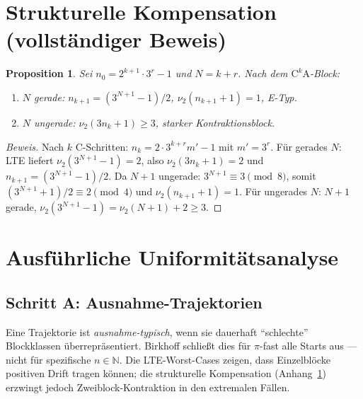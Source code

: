\documentclass[12pt,a4paper]{article}
\newtheorem{proposition}[satz]{Proposition}
\newenvironment{beweis}{\begin{proof}[Beweis]}{\end{proof}}
\newcommand{\vii}{\nu_2}
\newcommand{\N}{\mathbb{N}}
\begin{document}
\appendix

\section{Strukturelle Kompensation (vollständiger Beweis)}
\label{anhang:kompensation}

\begin{proposition}
Sei $n_0 = 2^{k+1}\cdot 3^r - 1$ und $N = k+r$. Nach dem
$\mathrm{C}^k\mathrm{A}$-Block:
\begin{enumerate}[label=(\roman*)]
  \item $N$ gerade: $n_{k+1} = (3^{N+1}-1)/2$, $\vii(n_{k+1}+1)=1$, E-Typ.
  \item $N$ ungerade: $\vii(3n_k+1) \geq 3$, starker Kontraktionsblock.
\end{enumerate}
\end{proposition}

\begin{beweis}
Nach $k$ C-Schritten: $n_k = 2\cdot 3^{k+r} m' - 1$ mit $m'=3^r$.
Für gerades $N$: LTE liefert $\vii(3^{N+1}-1)=2$, also
$\vii(3n_k+1)=2$ und $n_{k+1}=(3^{N+1}-1)/2$.
Da $N+1$ ungerade: $3^{N+1} \equiv 3 \pmod 8$, somit
$(3^{N+1}+1)/2 \equiv 2 \pmod 4$ und $\vii(n_{k+1}+1)=1$.
Für ungerades $N$: $N+1$ gerade, $\vii(3^{N+1}-1)=\vii(N+1)+2\geq 3$.
\end{beweis}

\section{Ausführliche Uniformitätsanalyse}
\label{anhang:uniformitaet}

\subsection{Schritt A: Ausnahme-Trajektorien}

Eine Trajektorie ist \emph{ausnahme-typisch}, wenn sie dauerhaft ``schlechte''
Blockklassen überrepräsentiert. Birkhoff schließt dies für $\pi$-fast alle
Starts aus --- nicht für spezifische $n\in\N$. Die LTE-Worst-Cases zeigen,
dass Einzelblöcke positiven Drift tragen können; die strukturelle
Kompensation (Anhang~\ref{anhang:kompensation}) erzwingt jedoch
Zweiblock-Kontraktion in den extremalen Fällen.
\end{document}
